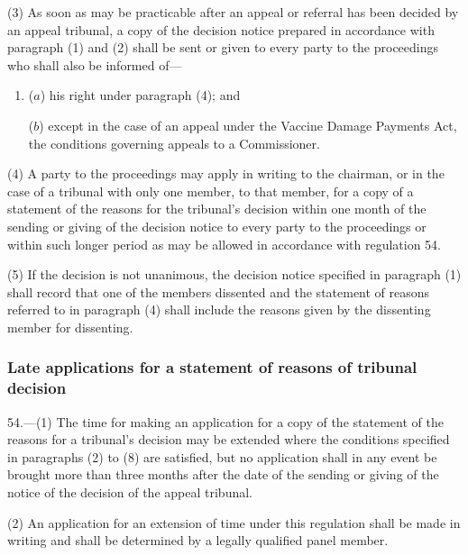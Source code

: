 \documentclass[12pt,a4paper]{article}
\begin{document}
(3) As soon as may be practicable after an appeal or referral has been decided by an appeal tribunal, a copy of the decision notice prepared in accordance with paragraph (1) and (2) shall be sent or given to every party to the proceedings who shall also be informed of—
\begin{enumerate}\item[]
($a$) his right under paragraph (4); and


($b$) except in the case of an appeal under the Vaccine Damage Payments Act, the conditions governing appeals to a Commissioner.
\end{enumerate}

(4) A party to the proceedings may apply in writing to the chairman, or in the case of a tribunal with only one member, to that member, for a copy of a statement of the reasons for the tribunal’s decision within one month of the sending or giving of the decision notice to every party to the proceedings or within such longer period as may be allowed in accordance with regulation 54.

(5) If the decision is not unanimous, the decision notice specified in paragraph (1) shall record that one of the members dissented and the statement of reasons referred to in paragraph (4) shall include the reasons given by the dissenting member for dissenting.


\subsubsection[54. Late applications for a statement of reasons of tribunal decision]{Late applications for a statement of reasons of tribunal decision}

54.—(1) The time for making an application for a copy of the statement of the reasons for a tribunal’s decision may be extended where the conditions specified in paragraphs (2) to (8) are satisfied, but no application shall in any event be brought more than three months after the date of the sending or giving of the notice of the decision of the appeal tribunal.

(2) An application for an extension of time under this regulation shall be made in writing and shall be determined by a legally qualified panel member.
\end{document}
